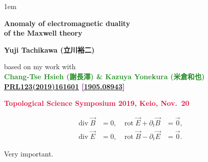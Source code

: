 \documentclass[xcolor={svgnames,rgb}]{beamer}
\date[]{}
\def\bff{\ifmmode\else\bfseries\fi}
\def\red#1{\textcolor{Crimson}{\bff #1}}
\def\green#1{\textcolor{ForestGreen}{\bff #1}}
\def\blue#1{\textcolor{myblue}{\bff #1}}
\def\purple#1{\textcolor{Purple}{\bff #1}}
\def\alert#1{\red{#1}}
\let\oldhref\href
\def\arxiv#1{\oldhref{http://arxiv.org/abs/#1}{#1}}
\begin{document}
\parskip1em 
\boldmath
\def\baselinestretch{1.1}



\def\incb#1{\vcenter{\hbox{\texttt{[image: \#1]}}}}
\def\inc#1{\vcenter{\hbox{\texttt{[image: \#1]}}}}
\def\incx#1{\vcenter{\hbox{\texttt{[image: \#1]}}}}
\def\incc#1{\vcenter{\hbox{\texttt{[image: \#1]}}}}

\begin{frame}
\bigskip\bigskip\bigskip\bigskip\bigskip

\vfill


\begin{exampleblock}{}
\begin{center}\LARGE\bfseries
\color{math}
Anomaly of electromagnetic duality \\
of the Maxwell theory
\end{center}
\end{exampleblock}

\bigskip\bigskip\bigskip
\begin{center}
\large  \blue{Yuji Tachikawa (立川裕二)} 

based on my work with \\
\green{Chang-Tse Hsieh (謝長澤) \& Kazuya Yonekura (米倉和也)}\\
\purple{\href{https://dx.doi.org/10.1103/PhysRevLett.123.161601}{PRL123(2019)161601} [\arxiv{1905.08943}] }


\bigskip
\large \alert{Topological Science Symposium 2019, Keio, Nov.~20}

\end{center}
\bigskip\bigskip\bigskip
\vfill


\end{frame}



\def\div{\mathop{\mathrm{div}}}
\def\rot{\mathop{\mathrm{rot}}}
\begin{frame}
\LARGE
\begin{align*}
\div \vec B&=0,  &\rot \vec E + \partial_t \vec B&=\vec 0, \\
\div \vec E&=0, & \rot \vec B - \partial_t \vec E&=\vec 0.
\end{align*}
\begin{center}

\bigskip\bigskip

Very important.
\end{center}

\end{frame}
\end{document}
